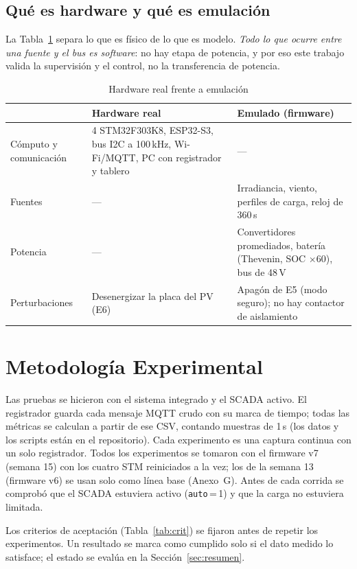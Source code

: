 \documentclass[conference]{IEEEtran}
\begin{document}
\subsection{Qué es hardware y qué es emulación}

La Tabla~\ref{tab:hw} separa lo que es físico de lo que es modelo. \emph{Todo lo que ocurre entre una fuente y el bus es software}: no hay etapa de potencia, y por eso este trabajo valida la supervisión y el control, no la transferencia de potencia.

\begin{table}[H]
\caption{Hardware real frente a emulación}
\label{tab:hw}
\centering
\scriptsize\setlength{\tabcolsep}{3pt}
\begin{tabular}{|p{1.45cm}|p{2.7cm}|p{2.6cm}|}
\hline
 & \textbf{Hardware real} & \textbf{Emulado (firmware)} \\
\hline
Cómputo y comunicación & 4 STM32F303K8, ESP32-S3, bus I2C a 100\,kHz, Wi-Fi/MQTT, PC con registrador y tablero & --- \\ \hline
Fuentes & --- & Irradiancia, viento, perfiles de carga, reloj de 360\,s \\ \hline
Potencia & --- & Convertidores promediados, batería (Thevenin, SOC $\times60$), bus de 48\,V \\ \hline
Perturbaciones & Desenergizar la placa del PV (E6) & Apagón de E5 (modo seguro); no hay contactor de aislamiento \\ \hline
\end{tabular}
\end{table}

\section{Metodología Experimental}
\label{sec:metodo}

Las pruebas se hicieron con el sistema integrado y el SCADA activo. El registrador guarda cada mensaje MQTT crudo con su marca de tiempo; todas las métricas se calculan a partir de ese CSV, contando muestras de 1\,s (los datos y los scripts están en el repositorio). Cada experimento es una captura continua con un solo registrador. Todos los experimentos se tomaron con el firmware v7 (semana 15) con los cuatro STM reiniciados a la vez; los de la semana 13 (firmware v6) se usan solo como línea base (Anexo~G). Antes de cada corrida se comprobó que el SCADA estuviera activo (\texttt{auto}\,=\,1) y que la carga no estuviera limitada.

Los criterios de aceptación (Tabla~\ref{tab:crit}) se fijaron antes de repetir los experimentos. Un resultado se marca como cumplido solo si el dato medido lo satisface; el estado se evalúa en la Sección~\ref{sec:resumen}.
\end{document}
